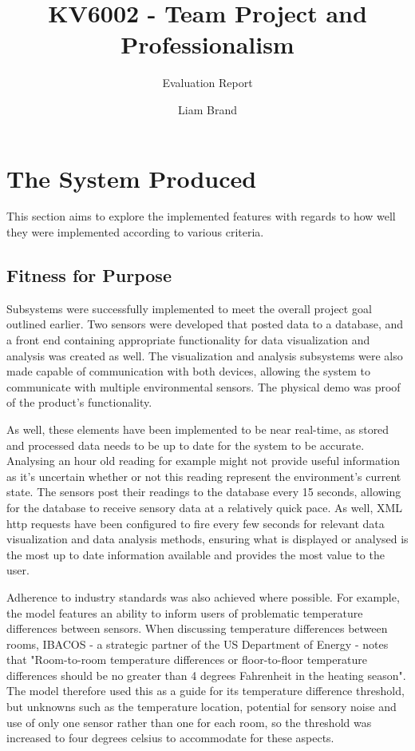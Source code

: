 \documentclass[]{report}
\title{KV6002 - Team Project and Professionalism}
\subtitle{Evaluation Report}
\author{Liam Brand}
\date{}
\begin{document}
\maketitle

\section{The System Produced}
This section aims to explore the implemented features with regards to how well they were implemented according to various criteria.

	\subsection{Fitness for Purpose}
	Subsystems were successfully implemented to meet the overall project goal outlined earlier. Two sensors were developed that posted data to a database, and a front end containing appropriate functionality for data visualization and analysis was created as well. The visualization and analysis subsystems were also made capable of communication with both devices, allowing the system to communicate with multiple environmental sensors. The physical demo was proof of the product's functionality.
	
	As well, these elements have been implemented to be near real-time, as stored and processed data needs to be up to date for the system to be accurate. Analysing an hour old reading for example might not provide useful information as it's uncertain whether or not this reading represent the environment's current state. The sensors post their readings to the database every 15 seconds, allowing for the database to receive sensory data at a relatively quick pace. As well, XML http requests have been configured to fire every few seconds for relevant data visualization and data analysis methods, ensuring what is displayed or analysed is the most up to date information available and provides the most value to the user.
	
	Adherence to industry standards was also achieved where possible. For example, the model features an ability to inform users of problematic temperature differences between sensors. When discussing temperature differences between rooms, IBACOS - a strategic partner of the US Department of Energy - notes that "Room-to-room temperature differences or floor-to-floor temperature differences should be no greater than 4 degrees Fahrenheit in the heating season"\cite{burdick2011advanced}. The model therefore used this as a guide for its temperature difference threshold, but unknowns such as the temperature location, potential for sensory noise and use of only one sensor rather than one for each room, so the threshold was increased to four degrees celsius to accommodate for these aspects.
	
\end{document}
